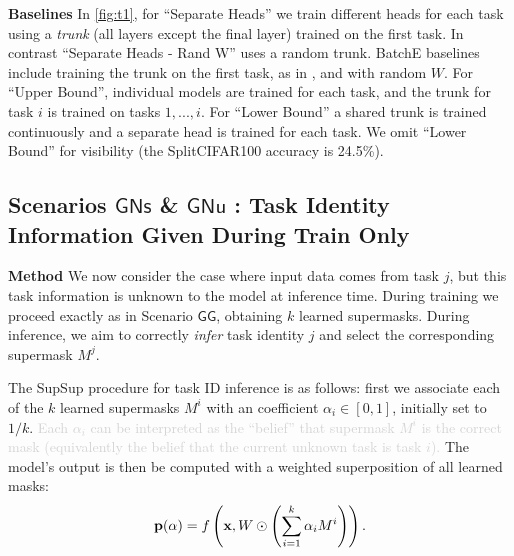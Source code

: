 \documentclass{article}
\newcommand{\ac}{SupSup\xspace}
\newcommand{\comments}[1]{#1}
\newcommand{\comments}[1]{}
\newcommand{\removed}[1]{\comments{\textcolor{lightgray}{#1}}}
\newcommand{\casename}[1]{\ensuremath{\mathsf{#1}}\xspace}
\begin{document}
\textbf{Baselines } In \autoref{fig:t1}, for ``Separate Heads'' we train different heads for each task using a \emph{trunk} (all layers except the final layer) trained on the first task. In contrast ``Separate Heads - Rand W'' uses a random trunk. BatchE baselines include training the trunk on the first task, as in \cite{wen2020batchensemble}, and with random $W$. For ``Upper Bound'', individual models are trained for each task, and the trunk for task $i$ is trained on tasks $1,...,i$. For ``Lower Bound'' a shared trunk is trained continuously and a separate head is trained for each task. We omit ``Lower Bound'' for visibility (the SplitCIFAR100 accuracy is 24.5\%).

\subsection{Scenarios \casename{GNs} \& \casename{GNu} : Task Identity Information Given During Train Only} \label{sec:S23}
\textbf{Method} We now consider the case where input data comes from task $j$, but this task information is unknown to the model at inference time. During training we proceed exactly as in Scenario \casename{GG}, obtaining $k$ learned supermasks. During inference, we aim to correctly \emph{infer} task identity $j$ and select the corresponding supermask $M^j$. 

The \ac procedure for task ID inference is as follows: first we associate each of the $k$ learned supermasks $M^i$ with an coefficient $\alpha_i \in [0,1]$, initially set to $1/k$. \removed{Each $\alpha_i$ can be interpreted as the ``belief'' that supermask $M^i$ is the correct mask (equivalently the belief that the current unknown task is task $i$).} The model's output is then be computed with a weighted superposition of all learned masks: 
\vspace{-.7em}
\begin{equation} \label{eq:sup}
    \p(\alpha) = f\round{\x, W \odot \round{ \sum_{i=1}^k \alpha_i M^i}}.
    \vspace{-1em}
\end{equation}
\end{document}
